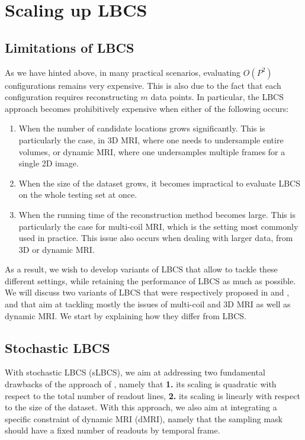 \section{Scaling up LBCS}\label{sec:improved_LBCS}
\subsection{Limitations of LBCS}
As we have hinted above, in many practical scenarios, evaluating $O(P^2)$ configurations remains very expensive. This is also due to the fact that each configuration requires reconstructing $m$ data points. In particular, the LBCS approach becomes prohibitively expensive when either of the following occurs: 
\begin{enumerate}
    \item When the number of candidate locations grows significantly. This is particularly the case, in 3D MRI, where one needs to undersample entire volumes, or dynamic MRI, where one undersamples multiple frames for a single 2D image.
    \item When the size of the dataset grows, it becomes impractical to evaluate LBCS on the whole testing set at once.
    \item When the running time of the reconstruction method becomes large. This is particularly the case for multi-coil MRI, which is the setting most commonly used in practice. This issue also occurs when dealing with larger data, from 3D or dynamic MRI. 
\end{enumerate} 

As a result, we wish to develop variants of LBCS that allow to tackle these different settings, while retaining the performance of LBCS as much as possible. We will discuss two variants of LBCS that were respectively proposed in \citet{gozcu2019rethinking} and \citet{sanchez2019scalable}, and that aim at tackling mostly the issues of multi-coil and 3D MRI as well as dynamic MRI. We start by explaining how they differ from LBCS.

\subsection{Stochastic LBCS}\label{ss:slbcs}
With stochastic LBCS (sLBCS), we aim at addressing two fundamental drawbacks of the approach of \citet{gozcu2018learning}, namely that \textbf{1.} its scaling is  quadratic with respect to the total number of readout lines, \textbf{2.} its scaling is linearly with respect to the size of the dataset. With this approach, we also aim at integrating a specific constraint of dynamic MRI (dMRI), namely that the sampling mask should have a fixed number of readouts by temporal frame. 


